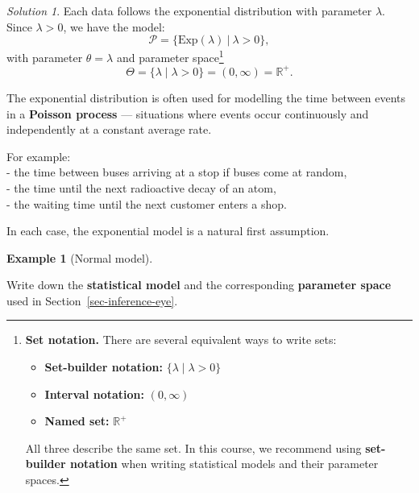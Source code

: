 \documentclass[
  letterpaper,
  DIV=11,
  numbers=noendperiod]{scrreprt}
\providecommand{\tightlist}{%
  \setlength{\itemsep}{0pt}\setlength{\parskip}{0pt}}
\theoremstyle{definition}
\newtheorem{example}{Example}[chapter]
\theoremstyle{plain}
\theoremstyle{definition}
\theoremstyle{remark}
\newtheorem{refsolution}{Solution}[chapter]
\begin{document}
\begin{refsolution}
Each data follows the exponential distribution with parameter
\(\lambda\). Since \(\lambda > 0\), we have the model: \[
\mathcal{P}=\big\{\mathrm{Exp}(\lambda)\ \big|\ \lambda>0\big\},
\] with parameter \(\theta=\lambda\) and parameter space\footnote{\textbf{Set
  notation.} There are several equivalent ways to write sets:

  \begin{itemize}
  \tightlist
  \item
    \textbf{Set-builder notation:} \(\{\lambda \mid \lambda > 0\}\)\\
  \item
    \textbf{Interval notation:} \((0,\infty)\)\\
  \item
    \textbf{Named set:} \(\mathbb{R}^+\)
  \end{itemize}

  All three describe the same set. In this course, we recommend using
  \textbf{set-builder notation} when writing statistical models and
  their parameter spaces.} \[
\Theta = \{\lambda \mid \lambda > 0\} = (0,\infty) = \mathbb{R}^+.
\]

The exponential distribution is often used for modelling the time
between events in a \textbf{Poisson process} --- situations where events
occur continuously and independently at a constant average rate.

For example:\\
- the time between buses arriving at a stop if buses come at random,\\
- the time until the next radioactive decay of an atom,\\
- the waiting time until the next customer enters a shop.

In each case, the exponential model is a natural first assumption.

\label{sol-exponential-model}

\end{refsolution}

\begin{example}[Normal
model]\protect\hypertarget{exm-normal-model}{}\label{exm-normal-model}

Write down the \textbf{statistical model} and the corresponding
\textbf{parameter space} used in Section~\ref{sec-inference-eye}.

\end{example}
\end{document}
